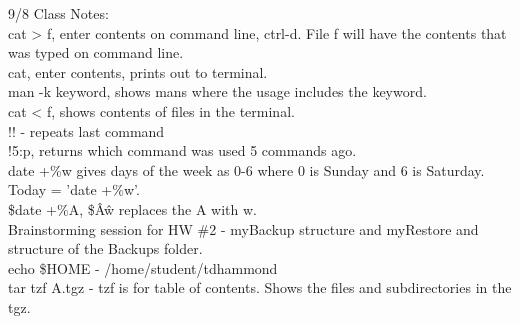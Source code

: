 \documentclass{article}
\begin{document}
9/8 Class Notes:\\
cat > f, enter contents on command line, ctrl-d. File f will have the contents that was typed on command line.\\

cat, enter contents, prints out to terminal.\\

man -k keyword, shows mans where the usage includes the keyword.\\

cat < f, shows contents of files in the terminal.\\

!! - repeats last command\\

!5:p, returns which command was used 5 commands ago.\\

date +\%w gives days of the week as 0-6 where 0 is Sunday and 6 is Saturday. Today = 'date +\%w'.\\

\$date +\%A, \$\^A\^w replaces the A with w.\\

Brainstorming session for HW \#2 - myBackup structure and myRestore and structure of the Backups folder.\\

echo \$HOME - /home/student/tdhammond\\

tar tzf A.tgz - tzf is for table of contents. Shows the files and subdirectories in the tgz.\\
\end{document}
